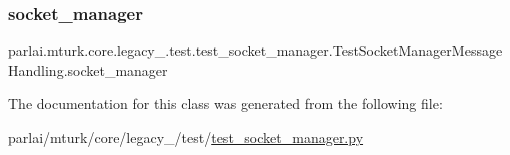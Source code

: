 \subsubsection{\texorpdfstring{socket\+\_\+manager}{socket\_manager}}
{\footnotesize\ttfamily parlai.\+mturk.\+core.\+legacy\+\_.\+test.\+test\+\_\+socket\+\_\+manager.\+Test\+Socket\+Manager\+Message\+Handling.\+socket\+\_\+manager}



The documentation for this class was generated from the following file\+:\begin{DoxyCompactItemize}
\item 
parlai/mturk/core/legacy\+\_/test/\hyperlink{legacy__2018_2test_2test__socket__manager_8py}{test\+\_\+socket\+\_\+manager.\+py}\end{DoxyCompactItemize}
